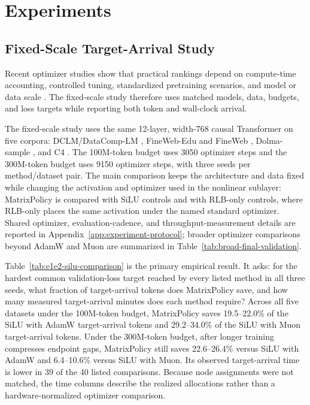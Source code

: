 \documentclass{article}
\begin{document}
\FloatBarrier
\section{Experiments}
\label{sec:experiments}

\subsection{Fixed-Scale Target-Arrival Study}
\label{sec:fixed-scale-results}

Recent optimizer studies show that practical rankings depend on compute-time
accounting, controlled tuning, standardized pretraining scenarios, and model or
data scale \citep{shah2025practicalefficiency,semenov2025benchmarking,
wen2026fantastic,volkova2026optimizerlaws}.  The fixed-scale study therefore uses
matched models, data, budgets, and loss targets while reporting both token and
wall-clock arrival.

The fixed-scale study uses the same 12-layer, width-768 causal Transformer on
five corpora: DCLM/DataComp-LM \citep{li2024datacomp}, FineWeb-Edu and FineWeb
\citep{penedo2024fineweb}, Dolma-sample \citep{soldaini2024dolma}, and C4
\citep{raffel2020t5}.  The 100M-token budget uses 3050 optimizer steps and
the 300M-token budget uses 9150 optimizer steps, with three seeds per
method/dataset pair.  The main comparison keeps the architecture and data fixed
while changing the activation and optimizer used in the nonlinear sublayer:
MatrixPolicy is compared with SiLU controls and with RLB-only controls, where
RLB-only places the same activation under the named standard optimizer.
Shared optimizer, evaluation-cadence, and
throughput-measurement details are reported in
Appendix~\ref{app:experiment-protocol}; broader optimizer comparisons beyond
AdamW and Muon are summarized in Table~\ref{tab:broad-final-validation}.


\FloatBarrier

Table~\ref{tab:e1e2-silu-comparison} is the primary empirical result.  It asks:
for the hardest common validation-loss target reached by every listed method in
all three seeds, what fraction of target-arrival tokens does MatrixPolicy save,
and how many measured target-arrival minutes does each method require?  Across all
five datasets under the 100M-token budget, MatrixPolicy saves 19.5--22.0\% of
the SiLU with AdamW target-arrival tokens and 29.2--34.0\% of the SiLU with
Muon target-arrival tokens.  Under the 300M-token budget, after longer training
compresses endpoint gaps, MatrixPolicy still saves 22.6--26.4\% versus SiLU
with AdamW and 6.4--10.6\% versus SiLU with Muon.  Its observed target-arrival
time is lower in 39 of the 40 listed comparisons.  Because node assignments
were not matched, the time columns describe the realized allocations rather
than a hardware-normalized optimizer comparison.
\end{document}
